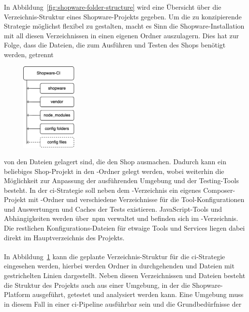 In Abbildung\ \ref{fig:shopware-folder-structure} wird eine Übersicht über die Verzeichnis-Struktur eines
Shopware-Projekts gegeben.
Um die zu konzipierende Strategie möglichst flexibel zu gestalten, macht es Sinn die Shopware-Installation mit all
diesen Verzeichnissen in einen eigenen Ordner auszulagern.
Dies hat zur Folge, dass die Dateien, die zum Ausführen und Testen des Shops benötigt werden, getrennt
\begin{figure}
    \centering
    \includegraphics[width=0.25\textwidth]{images/content/shopware-ci-folder-structure}
    \label{fig:shopware-ci-folder-structure}
\end{figure}
von den Dateien gelagert sind, die den Shop ausmachen.
Dadurch kann ein beliebiges Shop-Projekt in den -Ordner gelegt werden, wobei weiterhin die
Möglichkeit zur Anpassung der ausführenden Umgebung und der Testing-Tools besteht.
In der \acrshort{ci}-Strategie soll neben dem -Verzeichnis ein eigenes Composer-Projekt mit
-Ordner und verschiedene Verzeichnisse für die Tool-Konfigurationen und Auswertungen und Caches
der Tests existieren.
JavaScript-Tools und Abhängigkeiten werden über\ \acrshort{npm} verwaltet und befinden sich im
-Verzeichnis.
Die restlichen Konfigurations-Dateien für etwaige Tools und Services liegen dabei direkt im Hauptverzeichnis des
\mbox{Projekts}.
\\\\
In Abbildung\ \ref{fig:shopware-ci-folder-structure} kann die geplante Verzeichnis-Struktur für die
\acrshort{ci}-Strategie eingesehen werden, hierbei werden Ordner in durchgehenden und Dateien mit gestrichelten Linien
dargestellt.
Neben diesen Verzeichnissen und Dateien besteht die Struktur des Projekts auch aus einer Umgebung, in der die
Shopware-Platform ausgeführt, getestet und analysiert werden kann.
Eine Umgebung muss in diesem Fall in einer \acrshort{ci}-Pipeline ausführbar sein und die Grundbedürfnisse der
